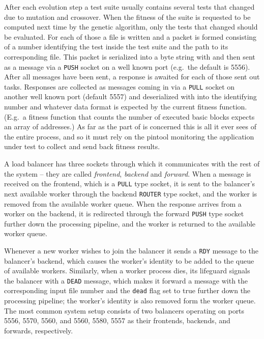 After each evolution step a test suite usually contains several tests that changed due to mutation and
crossover. When the fitness of the suite is requested to be computed next time by the genetic algorithm, 
only the tests that changed should be evaluated. For each of those a file is written and a packet is 
formed consisting of a number identifying the test inside the test suite and the path to its corresponding 
file. This packet is serialized into a byte string with \msgpack and then sent as a \zmq message via a 
\texttt{PUSH} socket on a well known port (e.g.\ the default is 5556). After all messages have been sent,
a response is awaited for each of those sent out tasks. Responses are collected as \zmq messages coming 
in via a \texttt{PULL} socket on another well known port (default 5557) and deserialized with \msgpack 
into the identifying number and whatever data format is expected by the current fitness function. 
(E.g.\ a fitness function that counts the number of executed basic blocks expects an array of addresses.)
As far as the \java part of \xmlmate is concerned this is all it ever sees of the entire process, and so it 
must rely on the pintool monitoring the application under test to collect and send back fitness results.

A load balancer has three \zmq sockets through which it communicates with the rest of the system -- they are
called \emph{frontend}, \emph{backend} and \emph{forward}. When a message is received on the frontend,
which is a \texttt{PULL} type socket, it is sent to the balancer's next available worker through
the backend \texttt{ROUTER} type socket, and the worker is removed from the available worker queue. When the
response arrives from a worker on the backend, it is redirected through the forward \texttt{PUSH} type socket
further down the processing pipeline, and the worker is returned to the available worker queue. 

Whenever a new worker wishes to join the balancer it sends a \texttt{RDY} message to the balancer's backend,
which causes the worker's identity to be added to the queue of available workers. Similarly, when a worker
process dies, its lifeguard signals the balancer with a \texttt{DEAD} message, which makes it forward a
message with the corresponding input file number and the \texttt{dead} flag set to true further down the
processing pipeline; the worker's identity is also removed form the worker queue. The most common system setup
consists of two balancers operating on ports 5556, 5570, 5560, and 5560, 5580, 5557 as their frontends,
backends, and forwards, respectively.

